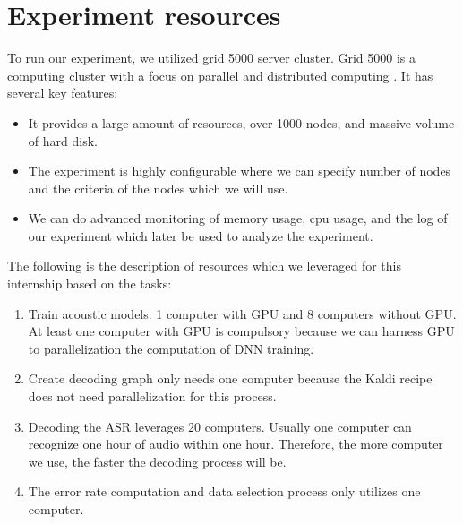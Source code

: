 
\section{Experiment resources}
To run our experiment, we utilized grid 5000 server cluster. Grid 5000 is a computing cluster with a focus on parallel and distributed computing \cite{Grid5000}. It has several key features:
\begin{itemize}
\item It provides a large amount of resources, over 1000 nodes, and massive volume of hard disk.
\item The experiment is highly configurable where we can specify number of nodes and the criteria of the nodes which we will use.
\item We can do advanced monitoring of memory usage, cpu usage, and the log of our experiment which later be used to analyze the experiment.
\end{itemize}

The following is the description of resources which we leveraged for this internship based on the tasks:
\begin{enumerate}
\item Train acoustic models: 1 computer with GPU and 8 computers without GPU. At least one computer with GPU is compulsory because we can harness GPU to parallelization the computation of DNN training. 
\item Create decoding graph only needs one computer because the Kaldi recipe does not need parallelization for this process.
\item Decoding the ASR leverages 20 computers. Usually one computer can recognize one hour of audio within one hour. Therefore, the more computer we use, the faster the decoding process will be. 
\item The error rate computation and data selection process only utilizes one computer. 
\end{enumerate}

